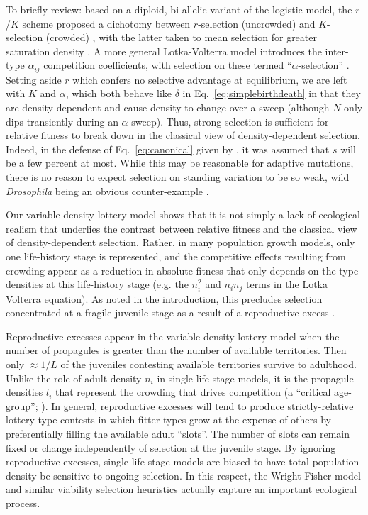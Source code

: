 \documentclass[12pt]{article}
\begin{document}
To briefly review: based on a diploid, bi-allelic variant of the logistic model, the $r$/$K$ scheme proposed a dichotomy between $r$-selection (uncrowded) and $K$-selection (crowded) \citep{macarthur_1962}, with the latter taken to mean selection for greater saturation density \citep{gill_1974}. A more general Lotka-Volterra model introduces the inter-type $\alpha_{ij}$ competition coefficients, with selection on these termed ``$\alpha$-selection'' \citep{gill_1974,joshi_2001}. Setting aside $r$ which confers no selective advantage at equilibrium, we are left with $K$ and $\alpha$, which both behave like $\delta$ in Eq.~\eqref{eq:simplebirthdeath} in that they are density-dependent and cause density to change over a sweep (although $N$ only dips transiently during an $\alpha$-sweep). Thus, strong selection is sufficient for relative fitness to break down in the classical view of density-dependent selection. Indeed, in the defense of Eq.~\eqref{eq:canonical} given by \cite{kimura1969natural}, it was assumed that $s$ will be a few percent at most. While this may be reasonable for adaptive mutations, there is no reason to expect selection on standing variation to be so weak, wild \textit{Drosophila} being an obvious counter-example \citep{bergland_14}.

Our variable-density lottery model shows that it is not simply a lack of ecological realism that underlies the contrast between relative fitness and the classical view of density-dependent selection. Rather, in many population growth models, only one life-history stage is represented, and the competitive effects resulting from crowding appear as a reduction in absolute fitness that only depends on the type densities at this life-history stage (e.g. the $n_i^2$ and $n_in_j$ terms in the Lotka Volterra equation). As noted in the introduction, this precludes selection concentrated at a fragile juvenile stage as a result of a reproductive excess \citep{chesson_1983,turner1968population,kimura1969natural,nei1971fertility}. 

Reproductive excesses appear in the variable-density lottery model when the number of propagules is greater than the number of available territories. Then only $\approx 1/L$ of the juveniles contesting available territories survive to adulthood. Unlike the role of adult density $n_i$ in single-life-stage models, it is the propagule densities $l_i$ that represent the crowding that drives competition (a ``critical age-group''; \citealt[pp. 54]{charlesworth_1994}). In general, reproductive excesses will tend to produce strictly-relative lottery-type contests in which fitter types grow at the expense of others by preferentially filling the available adult ``slots''. The number of slots can remain fixed or change independently of selection at the juvenile stage. By ignoring reproductive excesses, single life-stage models are biased to have total population density be sensitive to ongoing selection. In this respect, the Wright-Fisher model and similar viability selection heuristics actually capture an important ecological process.
\end{document}
